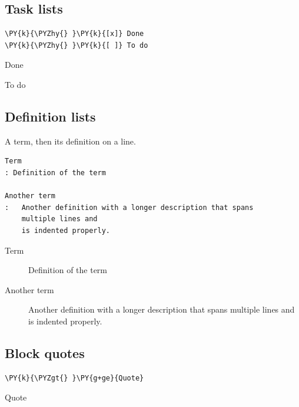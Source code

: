 \documentclass[a4paper,twoside]{article}
\begin{document}
\subsection{Task lists}
\begin{tscode}[lang=md, engine=pygments]
\begin{Verbatim}[commandchars=\\\{\},breaklines, breakanywhere, commandchars=\\\{\}]
\PY{k}{\PYZhy{} }\PY{k}{[x]} Done
\PY{k}{\PYZhy{} }\PY{k}{[ ]} To do
\end{Verbatim}
\end{tscode}
\begin{displayquote}
\begin{tstasklist}
\item[\tsdone] Done
\item[\tstodo] To do
\end{tstasklist}
\end{displayquote}
\subsection{Definition lists}
A term, then its definition on a \tscodeinline{:} line.
\begin{tscode}[lang=md, engine=pygments]
\begin{Verbatim}[commandchars=\\\{\},breaklines, breakanywhere, commandchars=\\\{\}]
Term
: Definition of the term

Another term
:   Another definition with a longer description that spans
    multiple lines and
    is indented properly.
\end{Verbatim}
\end{tscode}
\begin{displayquote}
\begin{description}
\item[{Term}] Definition of the term
\item[{Another term}] Another definition with a longer description that spans
multiple lines and
is indented properly.
\end{description}
\end{displayquote}
\subsection{Block quotes}
\begin{tscode}[lang=md, engine=pygments]
\begin{Verbatim}[commandchars=\\\{\},breaklines, breakanywhere, commandchars=\\\{\}]
\PY{k}{\PYZgt{} }\PY{g+ge}{Quote}
\end{Verbatim}
\end{tscode}
\begin{displayquote}
Quote
\end{displayquote}
\end{document}
